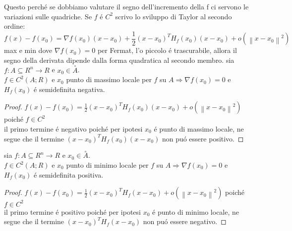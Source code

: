 Questo perch\'e se dobbiamo valutare il segno dell'incremento della f ci servono le variazioni sulle quadriche. Se $f$ \'e $C^2$ scrivo lo sviluppo di Taylor al secondo ordine:\\
$$f(x)-f(x_0)=\nabla f(x_0)(x-x_0)+\frac{1}{2}(x-x_0)^TH_f(x_0)(x-x_0)+o(\left\|x-x_0\right\|^2)$$
max e min dove $\nabla f(x_0)=0$ per Fermat, l'o piccolo \'e trascurabile, allora il segno della derivata dipende dalla forma quadratica al secondo membro.
\proposition
sia $f:A\subseteq R^n\rightarrow R$ e $x_0\in\overset{\circ}{A}$.\\
$f\in C^2(A;R)$ e $x_0$ punto di massimo locale per $f$ su $A\Rightarrow\nabla f(x_0)=0$ e $H_f(x_0)$ \'e semidefinita negativa.
\begin{proof}
	$f(x)-f(x_0)=\frac{1}{2}(x-x_0)^TH_f(x_0)(x-x_0)+o(\left\|x-x_0\right\|^2)$ poich\'e $f\in C^2$\\
	il primo termine \'e negativo poich\'e per ipotesi $x_0$ \'e punto di massimo locale, ne segue che il termine $(x-x_0)^TH_f(x_0)(x-x_0)$ non pu\'o essere positivo. 
\end{proof} 
\proposition
sia $f:A\subseteq R^n\rightarrow R$ e $x_0\in\overset{\circ}{A}$.\\
$f\in C^2(A;R)$ e $x_0$ punto di minimo locale per $f$ su $A\Rightarrow\nabla f(x_0)=0$ e $H_f(x_0)$ \'e semidefinita positiva.
\begin{proof}
	$f(x)-f(x_0)=\frac{1}{2}(x-x_0)^TH_f(x-x_0)+o(\left\|x-x_0\right\|^2)$ poich\'e $f\in C^2$\\
	il primo termine \'e positivo poich\'e per ipotesi $x_0$ \'e punto di minimo locale, ne segue che il termine $(x-x_0)^TH_f(x-x_0)$ non pu\'o essere negativo. 
\end{proof} 


